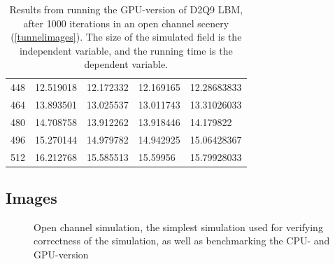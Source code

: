 \begin{table}[H]
\begin{tabular}{lllll}
448&	12.519018&	12.172332&	12.169165&	12.28683833\\
464&	13.893501&	13.025537&	13.011743&	13.31026033\\
480&	14.708758&	13.912262&	13.918446&	14.179822\\
496&	15.270144&	14.979782&	14.942925&	15.06428367\\
512&	16.212768&	15.585513&	15.59956	&	15.79928033\\
\bottomrule
\end{tabular}
\caption{Results from running the GPU-version of D2Q9 LBM, after 1000 iterations in an open channel scenery (\autoref{tunnelimages}). The size of the simulated field is the independent variable, and the running time is the dependent variable.}
\label{resultgpu}
\end{table}

\subsection{Images}
\begin{figure}[H]
\centering
{}
\hspace{1pt}
\caption{Open channel simulation, the simplest simulation used for verifying correctness of the simulation, as well as benchmarking the CPU- and GPU-version}
\label{tunnelimages}
\end{figure}